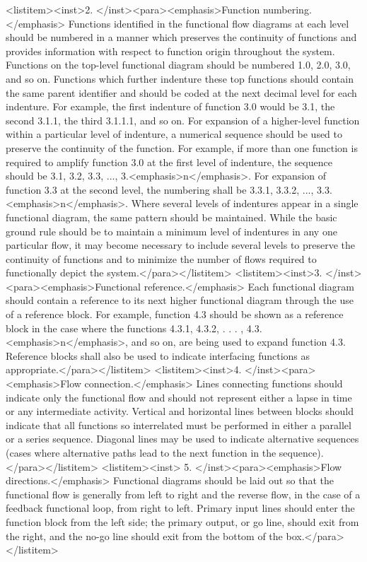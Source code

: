<listitem><inst>2.	</inst><para><emphasis>Function numbering.</emphasis> Functions identified in the functional flow diagrams at each level should be numbered in a manner which preserves the continuity of functions and provides information with respect to function origin throughout the system. Functions on the top-level functional diagram should be numbered 1.0, 2.0, 3.0, and so on. Functions which further indenture these top functions should contain the same parent identifier and should be coded at the next decimal level for each indenture. For example, the first indenture of function 3.0 would be 3.1, the second 3.1.1, the third 3.1.1.1, and so on. For expansion of a higher-level function within a particular level of indenture, a numerical sequence should be used to preserve the continuity of the function. For example, if more than one function is required to amplify function 3.0 at the first level of indenture, the sequence should be 3.1, 3.2, 3.3, ..., 3.<emphasis>n</emphasis>. For expansion of function 3.3 at the second level, the numbering shall be 3.3.1, 3.3.2, ..., 3.3.<emphasis>n</emphasis>. Where several levels of indentures appear in a single functional diagram, the same pattern should be maintained. While the basic ground rule should be to maintain a minimum level of indentures in any one particular flow, it may become necessary to include several levels to preserve the continuity of functions and to minimize the number of flows required to functionally depict the system.</para></listitem>
<listitem><inst>3.	</inst><para><emphasis>Functional reference.</emphasis> Each functional diagram should contain a reference to its next higher functional diagram through the use of a reference block. For example, function 4.3 should be shown as a reference block in the case where the functions 4.3.1, 4.3.2, . . . , 4.3.<emphasis>n</emphasis>, and so on, are being used to expand function 4.3. Reference blocks shall also be used to indicate interfacing functions as appropriate.</para></listitem>
<listitem><inst>4.	</inst><para><emphasis>Flow connection.</emphasis> Lines connecting functions should indicate only the functional flow and should not represent either a lapse in time or any intermediate activity. Vertical and horizontal lines between blocks should indicate that all functions so interrelated must be performed in either a parallel or a series sequence. Diagonal lines may be used to indicate alternative sequences (cases where alternative paths lead to the next function in the sequence).</para></listitem>
<listitem><inst>	5.	</inst><para><emphasis>Flow directions.</emphasis> Functional diagrams should be laid out so that the functional flow is generally from left to right and the reverse flow, in the case of a feedback functional loop, from right to left. Primary input lines should enter the function block from the left side; the primary output, or go line, should exit from the right, and the no-go line should exit from the bottom of the box.</para></listitem>
